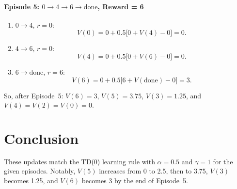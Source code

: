 \documentclass[11pt]{article}
\begin{document}
\paragraph*{Episode 5: \(0 \to 4 \to 6 \to \text{done}\), Reward = 6}
\begin{enumerate}
\item \(0 \to 4\), \(r=0\):
\[
V(0) = 0 + 0.5 \bigl[0 + V(4) - 0\bigr] = 0.
\]
\item \(4 \to 6\), \(r=0\):
\[
V(4) = 0 + 0.5 \bigl[0 + V(6) - 0\bigr] = 0.
\]
\item \(6 \to \text{done}\), \(r=6\):
\[
V(6) = 0 + 0.5 \bigl[6 + V(\text{done}) - 0\bigr]
      = 3.
\]
\end{enumerate}
So, after Episode~5: \(V(6) = 3\), \(V(5) = 3.75\), \(V(3) = 1.25\), 
and \(V(4) = V(2) = V(0) = 0\).

\section*{Conclusion}
These updates match the TD(0) learning rule with $\alpha=0.5$ and $\gamma=1$ for
the given episodes. Notably, $V(5)$ increases from 0 to 2.5, then to 3.75,
$V(3)$ becomes 1.25, and $V(6)$ becomes 3 by the end of Episode~5.
\end{document}
